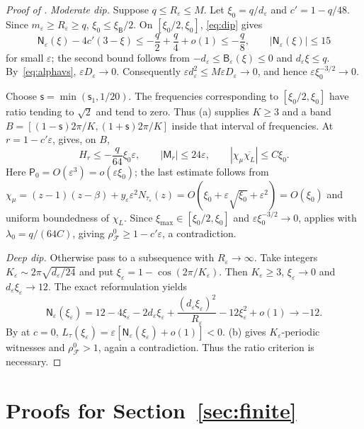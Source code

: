 \documentclass[11pt]{article}
\theoremstyle{definition}
\theoremstyle{remark}
\newcommand{\cF}{\mathcal F}
\newcommand{\sfP}{\mathsf P}
\newcommand{\rhoz}{\rho_{\cF}^{0}}
\begin{document}
\begin{proof}[Proof of ]
\emph{Moderate dip.}  Suppose \(q\le R_\varepsilon\le M\).
Let \(\xi_0=q/d_\varepsilon\) and \(c'=1-q/48\).
Since \(m_\varepsilon\ge R_\varepsilon\ge q\),
\(\xi_0\le\xi_{\mathsf B}/2\).
On \([\xi_0/2,\xi_0]\), \eqref{eq:dip} gives
\[
\mathsf N_\varepsilon(\xi)-4c'(3-\xi)
\le-\frac q2+\frac q4+o(1)\le-\frac q8,
\qquad |\mathsf N_\varepsilon(\xi)|\le15
\]
for small \(\varepsilon\); the second bound follows from
\(-d_\varepsilon\le\mathsf B_\varepsilon(\xi)\le0\) and
\(d_\varepsilon\xi\le q\).
By~\eqref{eq:alphavs}, \(\varepsilon D_\varepsilon\to0\).
Consequently
\(\varepsilon d_\varepsilon^2\le M\varepsilon D_\varepsilon\to0\), and hence
\(\varepsilon\xi_0^{-3/2}\to0\).

Choose \(\mathsf s=\min(\mathsf s_1,1/20)\).
The frequencies corresponding to \([\xi_0/2,\xi_0]\) have ratio tending to
\(\sqrt2\) and tend to zero.
Thus (a) supplies \(K\ge3\) and a band
\(B=[(1-\mathsf s)2\pi/K,(1+\mathsf s)2\pi/K]\) inside that interval of frequencies.
At \(r=1-c'\varepsilon\),  gives, on \(B\),
\[
H_r\le-\frac q{64}\xi_0\varepsilon,
\qquad |\mathsf M_r|\le24\varepsilon,
\qquad |\chi_\mu\overline{\chi_L}|\le C\xi_0.
\]
Here \(\sfP_0=O(\varepsilon^3)=o(\varepsilon\xi_0)\); the last estimate follows from
\(\chi_\mu=(z-1)(z-\beta)+y_\varepsilon\varepsilon^2N_{\tau_\varepsilon}(z)
=O(\xi_0+\varepsilon\sqrt{\xi_0}+\varepsilon^2)=O(\xi_0)\)
and uniform boundedness of \(\chi_L\).
Since \(\xi_{\max}\in[\xi_0/2,\xi_0]\) and
\(\varepsilon\xi_0^{-3/2}\to0\),  applies with
\(\lambda_0=q/(64C)\), giving \(\rhoz\ge1-c'\varepsilon\), a contradiction.

\emph{Deep dip.}  Otherwise pass to a subsequence with \(R_\varepsilon\to\infty\).
Take integers \(K_\varepsilon\sim2\pi\sqrt{d_\varepsilon/24}\) and put
\(\xi_\varepsilon=1-\cos(2\pi/K_\varepsilon)\).
Then \(K_\varepsilon\ge3\), \(\xi_\varepsilon\to0\) and
\(d_\varepsilon\xi_\varepsilon\to12\).  The exact reformulation yields
\[
\mathsf N_\varepsilon(\xi_\varepsilon)
=12-4\xi_\varepsilon-2d_\varepsilon\xi_\varepsilon
+\frac{(d_\varepsilon\xi_\varepsilon)^2}{R_\varepsilon}
-12\xi_\varepsilon^2+o(1)\to-12.
\]
By  at \(c=0\),
\(L_\tau(\xi_\varepsilon)=\varepsilon[\mathsf N_\varepsilon(\xi_\varepsilon)+o(1)]<0\).
(b) gives \(K_\varepsilon\)-periodic witnesses and \(\rhoz>1\), again a contradiction.
Thus the ratio criterion is necessary.
\end{proof}

%
\section{Proofs for Section~\ref{sec:finite}}
\label{app:finite}
%
\end{document}
